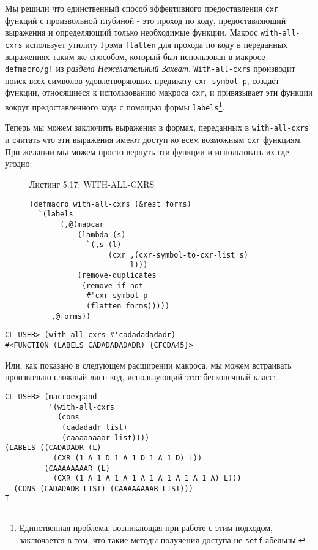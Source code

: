 Мы решили что единственный способ эффективного предоставления \verb"cxr" функций с произвольной глубиной - это проход по коду, предоставляющий выражения и определяющий только необходимые функции. Макрос \verb"with-all-cxrs" использует утилиту Грэма \verb"flatten" для прохода по коду в переданных выражениях таким же способом, который был использован в макросе \verb"defmacro/g!" из \emph{раздела Нежелательный Захват}. \verb"With-all-cxrs" производит поиск всех символов удовлетворяющих предикату \verb"cxr-symbol-p", создаёт функции, относящиеся к использованию макроса \verb"cxr", и привязывает эти функции вокруг предоставленного кода с помощью формы \verb"labels"\footnote{Единственная проблема, возникающая при работе с этим подходом, заключается в том, что такие методы получения доступа не \verb"setf"-абельны.}.

Теперь мы можем заключить выражения в формах, переданных в \verb"with-all-cxrs" и считать что эти выражения имеют доступ ко всем возможным \verb"cxr" функциям. При желании мы можем просто вернуть эти функции и использовать их где угодно:

\begin{figure}Листинг 5.17: WITH-ALL-CXRS\label{listing_5.17}
\listbegin
\begin{verbatim}
(defmacro with-all-cxrs (&rest forms)
  `(labels
       (,@(mapcar
           (lambda (s)
             `(,s (l)
                  (cxr ,(cxr-symbol-to-cxr-list s)
                       l)))
           (remove-duplicates
            (remove-if-not
             #'cxr-symbol-p
             (flatten forms)))))
     ,@forms))
\end{verbatim}
\listend
\end{figure}

\begin{verbatim}
CL-USER> (with-all-cxrs #'cadadadadadr)
#<FUNCTION (LABELS CADADADADADR) {CFCDA45}>
\end{verbatim}

Или, как показано в следующем расширении макроса, мы можем встраивать произвольно-сложный лисп код, использующий этот бесконечный класс:

\begin{verbatim}
CL-USER> (macroexpand
          '(with-all-cxrs
            (cons
             (cadadadr list)
             (caaaaaaaar list))))
(LABELS ((CADADADR (L)
           (CXR (1 A 1 D 1 A 1 D 1 A 1 D) L))
         (CAAAAAAAAR (L)
           (CXR (1 A 1 A 1 A 1 A 1 A 1 A 1 A 1 A) L)))
  (CONS (CADADADR LIST) (CAAAAAAAAR LIST)))
T
\end{verbatim}


